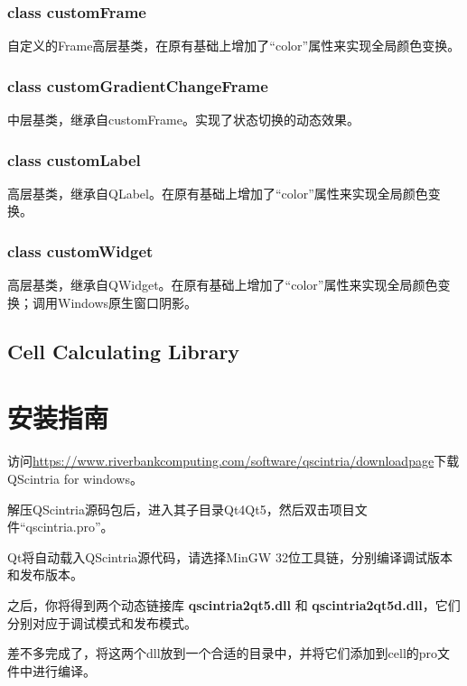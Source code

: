 \documentclass[UTF8]{ctexart}
\begin{document}
			\subsubsection{class customFrame}
			自定义的Frame高层基类，在原有基础上增加了“color”属性来实现全局颜色变换。
			\subsubsection{class customGradientChangeFrame}
			中层基类，继承自customFrame。实现了状态切换的动态效果。
			\subsubsection{class customLabel}
			高层基类，继承自QLabel。在原有基础上增加了“color”属性来实现全局颜色变换。
			\subsubsection{class customWidget}
			高层基类，继承自QWidget。在原有基础上增加了“color”属性来实现全局颜色变换；调用Windows原生窗口阴影。
		\subsection{Cell Calculating Library}
	\section{安装指南}
	访问\url{https://www.riverbankcomputing.com/software/qscintria/downloadpage}下载QScintria for windows。

	解压QScintria源码包后，进入其子目录Qt4Qt5，然后双击项目文件“qscintria.pro”。
	
	Qt将自动载入QScintria源代码，请选择MinGW 32位工具链，分别编译调试版本和发布版本。
	
	之后，你将得到两个动态链接库 \textbf{qscintria2\textunderscore qt5.dll} 和 \textbf{qscintria2\textunderscore qt5d.dll}，它们分别对应于调试模式和发布模式。
	
	差不多完成了，将这两个dll放到一个合适的目录中，并将它们添加到cell的pro文件中进行编译。
\end{document}
